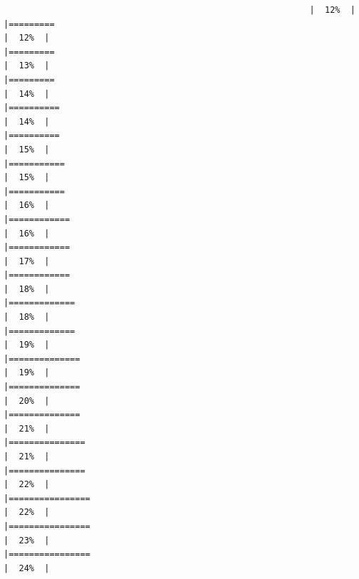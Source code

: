\documentclass[
  bookmarksnumbered]{article}
\begin{document}
\begin{verbatim}
                                                            |  12%  |                                                                              |=========                                                             |  12%  |                                                                              |=========                                                             |  13%  |                                                                              |=========                                                             |  14%  |                                                                              |==========                                                            |  14%  |                                                                              |==========                                                            |  15%  |                                                                              |===========                                                           |  15%  |                                                                              |===========                                                           |  16%  |                                                                              |============                                                          |  16%  |                                                                              |============                                                          |  17%  |                                                                              |============                                                          |  18%  |                                                                              |=============                                                         |  18%  |                                                                              |=============                                                         |  19%  |                                                                              |==============                                                        |  19%  |                                                                              |==============                                                        |  20%  |                                                                              |==============                                                        |  21%  |                                                                              |===============                                                       |  21%  |                                                                              |===============                                                       |  22%  |                                                                              |================                                                      |  22%  |                                                                              |================                                                      |  23%  |                                                                              |================                                                      |  24%  |                                                                              
\end{verbatim}
\end{document}
